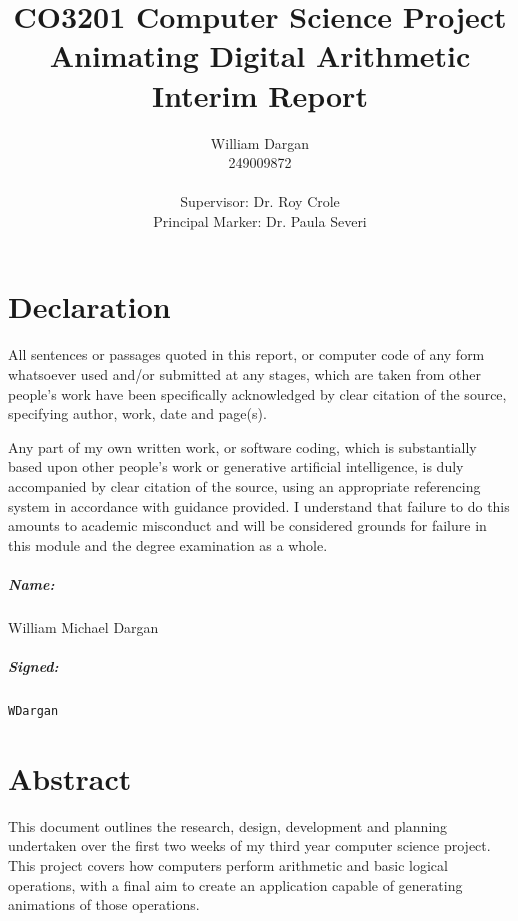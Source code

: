 \documentclass{report}
\title{CO3201 Computer Science Project\\ Animating Digital Arithmetic\\
Interim Report}
\author{William Dargan\\ 249009872\\\\ Supervisor: Dr. Roy Crole\\ Principal
Marker: Dr. Paula Severi}
\begin{document}
\maketitle

\setcounter{page}{2}

\chapter*{Declaration}
All sentences or passages quoted in this report, or computer code of any form
whatsoever used and/or submitted at any stages, which are taken from other
people's work have been specifically acknowledged by clear citation of the
source, specifying author, work, date and page(s). 
\vspace{3.25ex}

\noindent Any part of my own written work, or software coding, which is
substantially based upon other people's work or generative artificial
intelligence, is duly accompanied by clear citation of the source, using an
appropriate referencing system in accordance with guidance provided. I
understand that failure to do this amounts to academic misconduct and will be
considered grounds for failure in this module and the degree examination as a
whole.

\paragraph{Name:}
William Michael Dargan

\paragraph{Signed:}
\texttt{WDargan}

\chapter*{Abstract}
This document outlines the research, design, development and planning
undertaken over the first two weeks of my third year computer science project.
This project covers how computers perform arithmetic and basic logical
operations, with a final aim to create an application capable of generating
animations of those operations.
\vspace{3.25ex}
\end{document}
